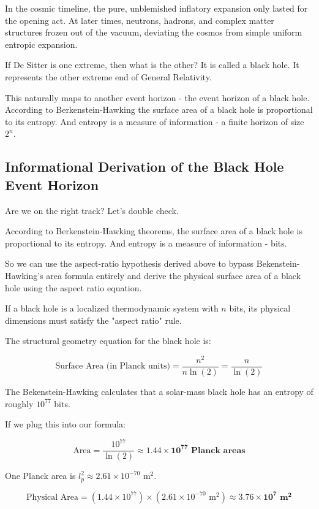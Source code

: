 In the cosmic timeline, the pure, unblemished inflatory expansion only lasted for the opening act. 
At later times, neutrons, hadrons, and complex matter structures frozen out of the vacuum, 
deviating the cosmos from simple uniform entropic expansion.

If De Sitter is one extreme, then what is the other? It is called a black hole. It represents the other
extreme end of General Relativity.

This naturally maps to another event horizon - the event horizon of a black hole.
According to Berkenstein-Hawking the surface area of a black hole is proportional to its entropy.
And entropy is a measure of information - a finite horizon of size $2^n$.



\subsection*{Informational Derivation of the Black Hole Event Horizon}

Are we on the right track?  Let's double check. 

According to Berkenstein-Hawking theorems, the surface area of a black hole
is proportional to its entropy. And entropy is a measure of information - bits. 

So we can use the aspect-ratio hypothesis derived above to bypass Bekenstein-Hawking's
area formula entirely and derive the physical surface area of a black hole using the aspect ratio equation.

If a black hole is a localized thermodynamic system with $n$ bits,
its physical dimensions must satisfy the "aspect ratio" rule.

The structural geometry equation for the black hole is:

\[
\text{Surface Area (in Planck units)} = \frac{n^2}{n \ln(2)} = \frac{n}{\ln(2)}
\]


The Bekenstein-Hawking calculates that a solar-mass black hole has an entropy of roughly $10^{77}$ bits.

If we plug this into our formula:

\[
\text{Area} = \frac{10^{77}}{\ln(2)} \approx \mathbf{1.44 \times 10^{77} \text{ Planck areas}}
\]

One Planck area is $l_p^2 \approx 2.61 \times 10^{-70} \text{ m}^2$.

\[
\text{Physical Area} = (1.44 \times 10^{77}) \times (2.61 \times 10^{-70} \text{ m}^2) \approx \mathbf{3.76 \times 10^7 \text{ m}^2}
\]


